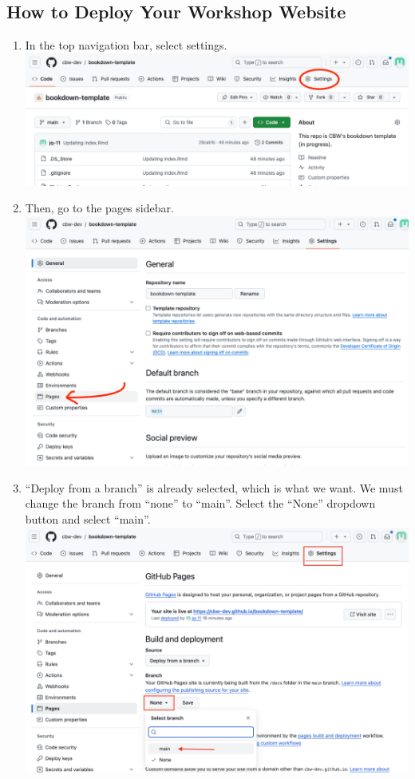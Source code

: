\documentclass[
]{book}
\theoremstyle{definition}
\theoremstyle{definition}
\theoremstyle{definition}
\theoremstyle{definition}
\theoremstyle{remark}
\begin{document}
\subsection{How to Deploy Your Workshop Website}\label{deploy-website}

\begin{enumerate}
\def\labelenumi{\arabic{enumi}.}
\item
  In the top navigation bar, select settings.
  \includegraphics{img/git-instruct/github-settings.png}
\item
  Then, go to the pages sidebar.
  \includegraphics{img/git-instruct/github-select-pages.png}
\item
  ``Deploy from a branch'' is already selected, which is what we want. We must change the branch from ``none'' to ``main''. Select the ``None'' dropdown button and select ``main''.
  \includegraphics{img/git-instruct/github-deploy-main.png}\\

\end{enumerate}
\end{document}
